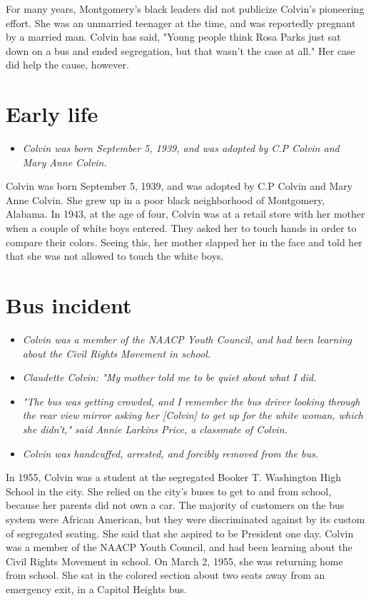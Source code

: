 For many years, Montgomery's black leaders did not publicize Colvin's
pioneering effort. She was an unmarried teenager at the time, and was
reportedly pregnant by a married man. Colvin has said, "Young people
think Rosa Parks just sat down on a bus and ended segregation, but that
wasn't the case at all." Her case did help the cause, however.

\section{Early life}\label{early-life}

\begin{itemize}
\item
  \emph{Colvin was born September 5, 1939, and was adopted by C.P Colvin
  and Mary Anne Colvin.}
\end{itemize}

Colvin was born September 5, 1939, and was adopted by C.P Colvin and
Mary Anne Colvin. She grew up in a poor black neighborhood of
Montgomery, Alabama. In 1943, at the age of four, Colvin was at a retail
store with her mother when a couple of white boys entered. They asked
her to touch hands in order to compare their colors. Seeing this, her
mother slapped her in the face and told her that she was not allowed to
touch the white boys.

\section{Bus incident}\label{bus-incident}

\begin{itemize}
\item
  \emph{Colvin was a member of the NAACP Youth Council, and had been
  learning about the Civil Rights Movement in school.}
\item
  \emph{Claudette Colvin: "My mother told me to be quiet about what I
  did.}
\item
  \emph{"The bus was getting crowded, and I remember the bus driver
  looking through the rear view mirror asking her {[}Colvin{]} to get up
  for the white woman, which she didn't," said Annie Larkins Price, a
  classmate of Colvin.}
\item
  \emph{Colvin was handcuffed, arrested, and forcibly removed from the
  bus.}
\end{itemize}

In 1955, Colvin was a student at the segregated Booker T. Washington
High School in the city. She relied on the city's buses to get to and
from school, because her parents did not own a car. The majority of
customers on the bus system were African American, but they were
discriminated against by its custom of segregated seating. She said that
she aspired to be President one day. Colvin was a member of the NAACP
Youth Council, and had been learning about the Civil Rights Movement in
school. On March 2, 1955, she was returning home from school. She sat in
the colored section about two seats away from an emergency exit, in a
Capitol Heights bus.

